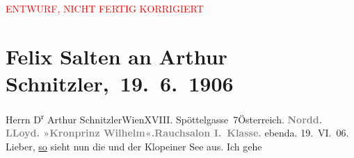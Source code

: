 
\begin{center}
            \textcolor{red}{ENTWURF, NICHT FERTIG KORRIGIERT}
                      \end{center}
            
         
         \renewcommand{\erwaehntePersonen}{Personen: Anna Katharina Rehmann, Felix Salten, Ottilie Salten, Paul Salten}
         \renewcommand{\erwaehnteInstitutionen}{Institutionen: Deutsch-amerikanische Seepost, Kronprinz Wilhelm, Norddeutscher Lloyd}
         \renewcommand{\erwaehnteOrte}{Orte: Bansin, Berlin, Dänemark, Edmund-Weiß-Gasse 7, England, Heringsdorf, Klopeiner See, Marienlyst, Nordsee, Wien, Österreich}
         \renewcommand{\erwaehnteWerke}{}
               \section[ Felix Salten an Arthur Schnitzler, 19. 6. 1906]{ Felix Salten an Arthur Schnitzler, 19. 6. 1906}\nopagebreak{}\rehead{ }\begin{ledgroupsized}[t]{13cm}\normalsize\beginnumbering \toendnotes[C]{\smallbreak\pagebreak[2]} 
\toendnotes[C]{\smallbreak}\pstart{}{\pb}Herrn D\textsuperscript{r} Arthur Schnitzler\pend{}\pstart{}Wien\pend{}\pstart{}XVIII. Spöttelgasse 7\pend{}\pstart{}Österreich.\pend{}{\bigskip}\pstart
           \noindent{}{\pb}\textcolor{gray}{\textbf{Nordd. LLoyd. »Kronprinz Wilhelm«.}}\hfill \textcolor{gray}{\textbf{Rauchsalon I. Klasse.}}\pend
           \pstart
           \raggedleft{}ebenda. 19. VI. 06.\pend
           \pstart
           Lieber,{ }\uline{so} sieht nun die \label{K_L03427-1v}\label{K_L03427-1h} und der Klopeiner See aus. Ich gehe

\end{ledgroupsized}
